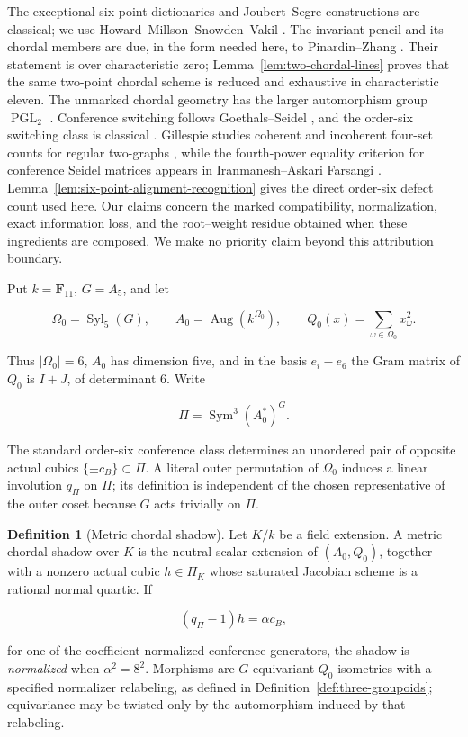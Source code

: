 \documentclass[11pt]{article}
\theoremstyle{definition}
\newtheorem{definition}[theorem]{Definition}
\theoremstyle{remark}
\newcommand{\F}{\mathbf F}
\newcommand{\Sym}{\operatorname{Sym}}
\newcommand{\PGL}{\operatorname{PGL}}
\newcommand{\Aug}{\operatorname{Aug}}
\begin{document}
The exceptional six-point dictionaries and Joubert--Segre constructions are
classical; we use Howard--Millson--Snowden--Vakil
\cite[\S\S1.1--1.6 and 2.1--2.4]{HMSVOuter}.  The invariant pencil and its
chordal members are due, in the form needed here, to Pinardin--Zhang
\cite[\S6.2]{PinardinZhang2025}.  Their statement is over characteristic
zero; Lemma~\ref{lem:two-chordal-lines} proves that the same two-point
chordal scheme is reduced and exhaustive in characteristic eleven.  The
unmarked chordal geometry has the larger
automorphism group \(\PGL_2\) \cite[\S5]{CheltsovEtAl2025Chordal}.
Conference switching follows Goethals--Seidel
\cite[\S\S1--3]{GoethalsSeidel1967}, and the order-six switching class is
classical \cite{BMS1979}.  Gillespie studies coherent and incoherent four-set
counts for regular two-graphs \cite[\S4.1]{GillespieTwoGraph}, while the
fourth-power equality criterion for conference Seidel matrices appears in
Iranmanesh--Askari Farsangi \cite[Theorem~2.4]{IranmaneshFarsangi2015}.
Lemma~\ref{lem:six-point-alignment-recognition} gives the direct order-six
defect count used here.  Our claims concern the marked compatibility,
normalization, exact information loss, and the root--weight residue obtained
when these ingredients are composed.  We make no priority claim beyond this
attribution boundary.

Put \(k=\F_{11}\), \(G=A_5\), and let

\[
 \Omega_0=\operatorname{Syl}_5(G),\qquad
 A_0=\Aug(k^{\Omega_0}),\qquad
 Q_0(x)=\sum_{\omega\in\Omega_0}x_\omega^2.
\]

Thus \(|\Omega_0|=6\), \(A_0\) has dimension five, and in the basis
\(e_i-e_6\) the Gram matrix of \(Q_0\) is \(I+J\), of determinant \(6\).
Write

\[
                   \Pi=\Sym^3(A_0^*)^G.
\]

The standard order-six conference class determines an unordered pair of
opposite actual cubics \(\{\pm c_B\}\subset\Pi\).  A literal outer permutation
of \(\Omega_0\) induces a linear involution \(q_\Pi\) on \(\Pi\); its definition
is independent of the chosen representative of the outer coset because \(G\)
acts trivially on \(\Pi\).

\begin{definition}[Metric chordal shadow]
\label{def:metric-chordal-shadow}
Let \(K/k\) be a field extension.  A metric chordal shadow over \(K\) is the
neutral scalar extension of \((A_0,Q_0)\), together with a nonzero actual
cubic \(h\in\Pi_K\) whose saturated Jacobian scheme is a rational normal
quartic.  If

\[
                   (q_\Pi-1)h=\alpha c_B,
\]

for one of the coefficient-normalized conference generators, the shadow is
\emph{normalized} when \(\alpha^2=8^2\).  Morphisms are \(G\)-equivariant
\(Q_0\)-isometries with a specified normalizer relabeling, as defined in
Definition~\ref{def:three-groupoids}; equivariance may be twisted only by the
automorphism induced by that relabeling.
\end{definition}
\end{document}
